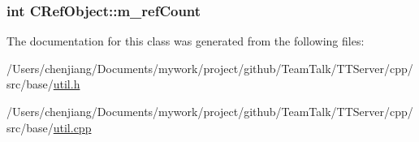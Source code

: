 \subsubsection[{m\+\_\+ref\+Count}]{\setlength{\rightskip}{0pt plus 5cm}int C\+Ref\+Object\+::m\+\_\+ref\+Count\hspace{0.3cm}{\ttfamily [private]}}\label{class_c_ref_object_a2478f02f3417e2bb4dc1439beb30199f}


The documentation for this class was generated from the following files\+:\begin{DoxyCompactItemize}
\item 
/\+Users/chenjiang/\+Documents/mywork/project/github/\+Team\+Talk/\+T\+T\+Server/cpp/src/base/\hyperlink{base_2util_8h}{util.\+h}\item 
/\+Users/chenjiang/\+Documents/mywork/project/github/\+Team\+Talk/\+T\+T\+Server/cpp/src/base/\hyperlink{base_2util_8cpp}{util.\+cpp}\end{DoxyCompactItemize}
